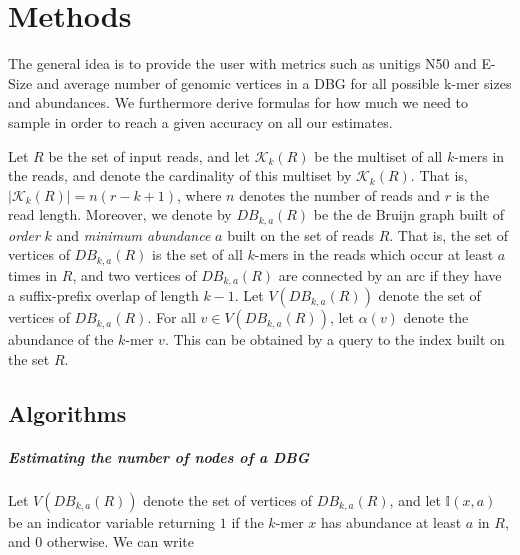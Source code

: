\documentclass[a4paper,11pt]{article}
\newcommand{\kristoffer}[1]{{\color{red}{#1}}}
\newcommand{\alex}[1]{{\color{blue}{#1}}}
\newcommand{\DB}{DB_{k,a}}
\newcommand{\abu}{\alpha}
\begin{document}
\section{Methods} %
\label{sec:methods}

The general idea is to provide the user with metrics such as unitigs N50 and E-Size and average number of genomic vertices in a DBG  for all possible k-mer sizes and abundances. \kristoffer{ We implement a FM-index data structure described in cite XX. This allows us to query a k-mer, its in and out neighbors in O() time. }  We furthermore derive formulas for how much we need to sample in order to reach a given accuracy on all our estimates. 

Let $R$ be the set of input reads, and let $\mathcal{K}_k(R)$ be the multiset of all $k$-mers in the reads, and denote the cardinality of this multiset by $\mathcal{K}_k(R)$. That is, $|\mathcal{K}_k(R)| = n(r-k+1)$, where $n$ denotes the number of reads and $r$ is the read length. Moreover, we denote by $\DB(R)$ be the de Bruijn graph built of \emph{order} $k$ and \emph{minimum abundance} $a$ built on the set of reads $R$. That is, the set of vertices of $\DB(R)$ is the set of all $k$-mers in the reads which occur at least $a$ times in $R$, and two vertices of $\DB(R)$ are connected by an arc if they have a suffix-prefix overlap of length $k-1$. Let $V(\DB(R))$ denote the set of vertices of $\DB(R)$. For all $v \in V(\DB(R))$, let $\abu(v)$ denote the abundance of the $k$-mer $v$. This can be obtained by a query to the index built on the set $R$.

\alex{Talk about reverse complements in dB graphs: a k-mer and its reverse complement are bundled into the same node and the abundances are added up. Say how we deal with this case in practice.}

\alex{Give pseudo-code of how we get the in/out degrees for all abundances.}

\alex{Say that one of the main ideas is to do weighted sampling.}

\subsection{Algorithms} %
\label{sub:algorithm}

\subparagraph{Estimating the number of nodes of a DBG} %
\label{subp:estimating_the_number_of_nodes_in_a_db_graph}

Let $V(\DB(R))$ denote the set of vertices of $\DB(R)$, and let $\mathbb{I}(x,a)$ be an indicator variable returning $1$ if the $k$-mer $x$ has abundance at least $a$ in $R$, and $0$ otherwise. We can write
\end{document}
